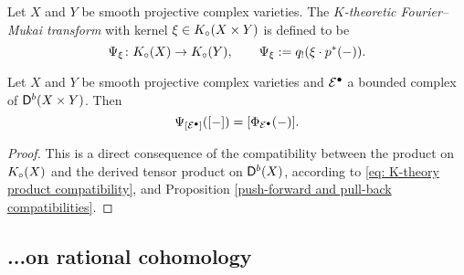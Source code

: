 
\begin{definition}
    Let $X$ and $Y$ be smooth projective complex varieties. The \emph{$K$-theoretic Fourier--Mukai transform} with kernel $\xi \in K_{\circ}(X \times Y)$ is defined to be
    \[
        \Psi_{\xi} \colon K_{\circ}(X) \to K_{\circ}(Y), \qquad \Psi_{\xi} := q_!(\xi \cdot p^*(-)).
    \]
\end{definition}

\begin{corollary}
    Let $X$ and $Y$ be smooth projective complex varieties and $\mathcal E^\bullet$ a bounded complex of $\mathsf{D}^b(X \times Y)$. Then
    \[
        \Psi_{[\mathcal E^\bullet]}([-]) = [\Phi_{\mathcal E^\bullet}(-)].
    \]
\end{corollary}

\begin{proof}
    This is a direct consequence of the compatibility between the product on $K_{\circ}(X)$ and the derived tensor product on $\mathsf{D}^b(X)$, according to \eqref{eq: K-theory product compatibility}, and Proposition \ref{push-forward and pull-back compatibilities}.
\end{proof}

\subsection{...on rational cohomology}
\label{Subsection: FM transform on cohomology}

